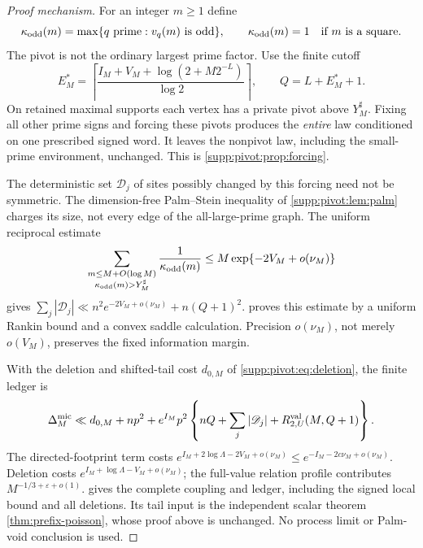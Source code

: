 \begin{proof}[Proof mechanism]
For an integer $m\ge1$ define
\[
 \kappa_{\rm odd}(m)=\max\{q\text{ prime}:v_q(m)\text{ is odd}\},
 \qquad \kappa_{\rm odd}(m)=1\quad\text{if }m\text{ is a square}.
\]
The pivot is not the ordinary largest prime factor. Use the finite cutoff
\begin{equation}\label{eq:micro-cutoff}
 E_M^*=\left\lceil
 \frac{I_M+V_M+\log(2+M2^{-L})}{\log2}\right\rceil,\qquad
 Q=L+E_M^*+1.
\end{equation}
On retained maximal supports each vertex has a private pivot above
$Y_M^\sharp$. Fixing all other prime signs and forcing these pivots
produces the \emph{entire} law conditioned on one prescribed signed
word. It leaves the nonpivot law, including the small-prime environment,
unchanged. This is \cref{supp:pivot:prop:forcing}.

The deterministic set $\mathscr D_j$ of sites possibly changed by this
forcing need not be symmetric. The dimension-free Palm--Stein inequality
of \cref{supp:pivot:lem:palm} charges its size, not every edge of the
all-large-prime graph. The uniform reciprocal estimate
\begin{equation}\label{eq:micro-reciprocal-intro}
 \sum_{\substack{m\le M+O(\log M)\\\kappa_{\rm odd}(m)>Y_M^\sharp}}
       \frac1{\kappa_{\rm odd}(m)}
 \le M\exp\{-2V_M+o(\nu_M)\}
\end{equation}
gives $\sum_j|\mathscr D_j|\ll
n^2e^{-2V_M+o(\nu_M)}+n(Q+1)^2$.
 proves this estimate by a uniform
Rankin bound and a convex saddle calculation. Precision $o(\nu_M)$,
not merely $o(V_M)$, preserves the fixed information margin.

With the deletion and shifted-tail cost $d_{0,M}$ of
\eqref{supp:pivot:eq:deletion}, the finite ledger is
\begin{equation}\label{eq:micro-ledger-main}
 \Delta_M^{\rm mic}\ll d_{0,M}+np^2+
 e^{I_M}p^2\left\{nQ+\sum_j|\mathscr D_j|
                    +R^{\rm val}_{2,U}(M,Q+1)\right\}.
\end{equation}
The directed-footprint term costs
$e^{I_M+2\log\Lambda-2V_M+o(\nu_M)}
 \le e^{-I_M-2c\nu_M+o(\nu_M)}$.
Deletion costs $e^{I_M+\log\Lambda-V_M+o(\nu_M)}$;
the full-value relation profile contributes $M^{-1/3+\varepsilon+o(1)}$.
 gives the complete coupling and
ledger, including the signed local bound and all deletions.
Its tail input is the independent scalar theorem
\cref{thm:prefix-poisson}, whose proof above is unchanged.
No process limit or Palm-void conclusion is used.
\end{proof}

